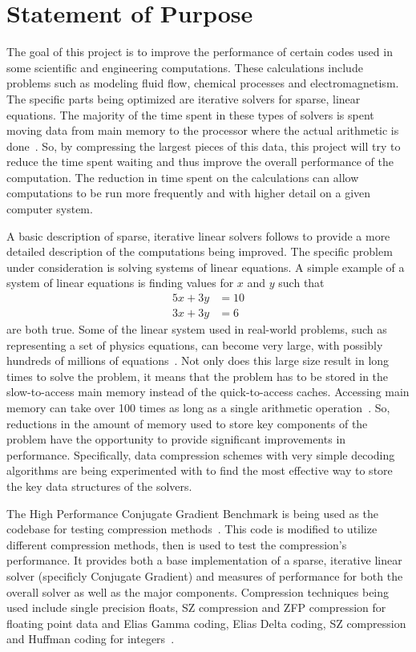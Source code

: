 \documentclass[titlepage]{article}
\begin{document}
\section{Statement of Purpose}
The goal of this project is to improve the performance of certain codes used in some scientific and engineering computations.
These calculations include problems such as modeling fluid flow, chemical processes and electromagnetism.
The specific parts being optimized are iterative solvers for sparse, linear equations.
The majority of the time spent in these types of solvers is spent moving data from main memory to the processor where the actual arithmetic is done~\cite{Lawlor:2013:compression}.
So, by compressing the largest pieces of this data, this project will try to reduce the time spent waiting and thus improve the overall performance of the computation.
The reduction in time spent on the calculations can allow computations to be run more frequently and with higher detail on a given computer system.

A basic description of sparse, iterative linear solvers follows to provide a more detailed description of the computations being improved.
The specific problem under consideration is solving systems of linear equations.
A simple example of a system of linear equations is finding values for \(x\) and \(y\) such that
\begin{align*}
	5x + 3y &= 10\\
	3x + 3y &= 6
\end{align*}
are both true.
Some of the linear system used in real-world problems, such as representing a set of physics equations, can become very large, with possibly hundreds of millions of equations~\cite{Davis:2011:FloridaMatrixCollection}.
Not only does this large size result in long times to solve the problem,
it means that the problem has to be stored in the slow-to-access main memory instead of the quick-to-access caches.
Accessing main memory can take over 100 times as long as a single arithmetic operation~\cite{Goumas:2009:performanceEval}.
So, reductions in the amount of memory used to store key components of the problem have the opportunity to provide significant improvements in performance.
Specifically, data compression schemes with very simple decoding algorithms are being experimented with
to find the most effective way to store the key data structures of the solvers.

The High Performance Conjugate Gradient Benchmark is being used as the codebase for testing compression methods~\cite{Dongarra:2015:HPCG}.
This code is modified to utilize different compression methods, then is used to test the compression's performance.
It provides both a base implementation of a sparse, iterative linear solver (specificly Conjugate Gradient) and measures of performance for both the overall solver as well as the major components.
Compression techniques being used include single precision floats, SZ compression and ZFP compression for floating point data and Elias Gamma coding, Elias Delta coding, SZ compression and Huffman coding for integers~\cite{Di:2016:SZ,Lindstrom:2014:zfp,Elias:1975:codeword,Huffman:1952:coding}.
\end{document}
